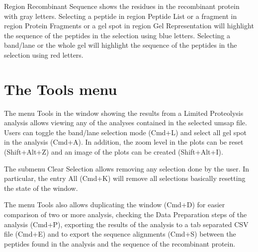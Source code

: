 Region Recombinant Sequence shows the residues in the recombinant protein with gray
letters. Selecting a peptide in region Peptide List or a fragment in region Protein
Fragments or a gel spot in region Gel Representation will highlight the sequence of the
peptides in the selection using blue letters. Selecting a band/lane or the whole gel
will highlight the sequence of the peptides in the selection using red letters.

\section{The Tools menu}
\label{sec:limprotToolsMenu}

The menu Tools in the window showing the results from a Limited Proteolysis analysis
allows viewing any of the analyses contained in the selected umsap file. Users
can toggle the band/lane selection mode (Cmd+L) and select all gel spot in the analysis
(Cmd+A). In addition, the zoom level in the plots can be reset (Shift+Alt+Z) and
an image of the plots can be created (Shift+Alt+I).

The submenu Clear Selection allows removing any selection done by the user. In
particular, the entry All (Cmd+K) will remove all selections basically resetting
the state of the window.

The menu Tools also allows duplicating the window (Cmd+D) for easier comparison of
two or more analysis, checking the Data Preparation steps of the analysis (Cmd+P),
exporting the results of the analysis to a tab separated CSV file (Cmd+E) and to
export the sequence alignments (Cmd+S) between the peptides found in the analysis
and the sequence of the recombinant protein.